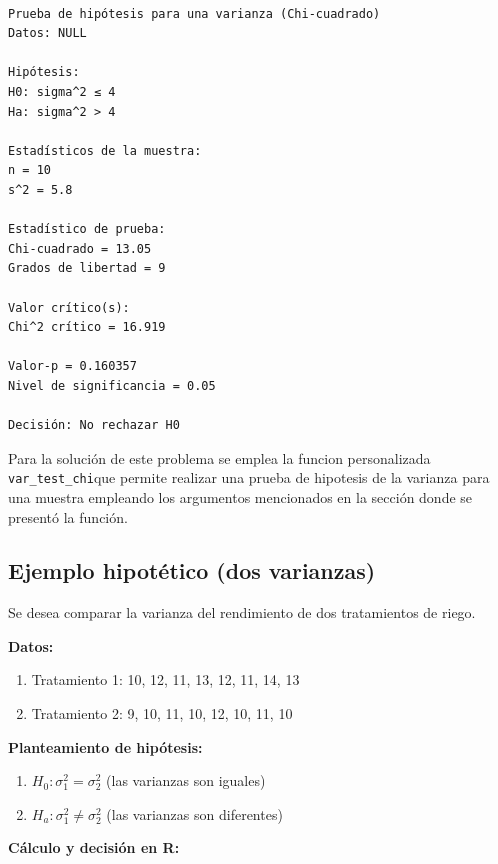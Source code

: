 \documentclass[
  spanish,
  letterpaper,
]{book}
\begin{document}
\begin{verbatim}

Prueba de hipótesis para una varianza (Chi-cuadrado) 
Datos: NULL 

Hipótesis:
H0: sigma^2 ≤ 4 
Ha: sigma^2 > 4 

Estadísticos de la muestra:
n = 10 
s^2 = 5.8 

Estadístico de prueba:
Chi-cuadrado = 13.05 
Grados de libertad = 9 

Valor crítico(s):
Chi^2 crítico = 16.919 

Valor-p = 0.160357 
Nivel de significancia = 0.05 

Decisión: No rechazar H0 
\end{verbatim}

Para la solución de este problema se emplea la funcion personalizada
\texttt{var\_test\_chi}que permite realizar una prueba de hipotesis de
la varianza para una muestra empleando los argumentos mencionados en la
sección donde se presentó la función.

\subsection{Ejemplo hipotético (dos
varianzas)}\label{ejemplo-hipotuxe9tico-dos-varianzas}

Se desea comparar la varianza del rendimiento de dos tratamientos de
riego.

\textbf{Datos:}

\begin{enumerate}
\def\labelenumi{\arabic{enumi}.}
\item
  Tratamiento 1: 10, 12, 11, 13, 12, 11, 14, 13
\item
  Tratamiento 2: 9, 10, 11, 10, 12, 10, 11, 10
\end{enumerate}

\textbf{Planteamiento de hipótesis:}

\begin{enumerate}
\def\labelenumi{\arabic{enumi}.}
\item
  \(H_0: \sigma_1^2 = \sigma_2^2\)\hspace{0pt} (las varianzas son
  iguales)
\item
  \(H_a: \sigma_1^2 \neq \sigma_2^2\) (las varianzas son diferentes)
\end{enumerate}

\textbf{Cálculo y decisión en R:}
\end{document}
